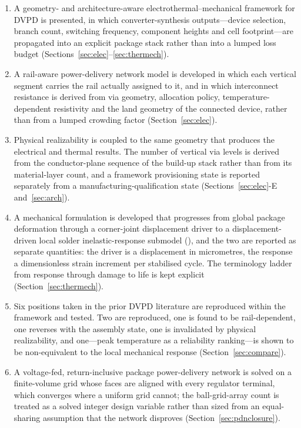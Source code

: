 \documentclass[journal]{IEEEtran}
\begin{document}
\begin{enumerate}
\item A geometry- and architecture-aware electrothermal--mechanical framework for DVPD is
presented, in which converter-synthesis outputs---device selection, branch count, switching
frequency, component heights and cell footprint---are propagated into an explicit package
stack rather than into a lumped loss budget (Sections~\ref{sec:elec}--\ref{sec:thermech}).

\item A rail-aware power-delivery network model is developed in which each vertical segment
carries the rail actually assigned to it, and in which interconnect resistance is derived
from via geometry, allocation policy, temperature-dependent resistivity and the land
geometry of the connected device, rather than from a lumped crowding factor
(Section~\ref{sec:elec}).

\item Physical realizability is coupled to the same geometry that produces the electrical
and thermal results. The number of vertical via levels is derived from the conductor-plane
sequence of the build-up stack rather than from its material-layer count, and a
framework provisioning state is reported separately from a manufacturing-qualification
state (Sections~\ref{sec:elec}-E and~\ref{sec:arch}).

\item A mechanical formulation is developed that progresses from global package deformation
through a corner-joint displacement driver to a displacement-driven local solder inelastic-response submodel (\LocalMeshPhrase), and the two are reported as
separate quantities: the driver is a displacement in micrometres, the response a
dimensionless strain increment per stabilised cycle. The terminology ladder from response
through damage to life is kept explicit (Section~\ref{sec:thermech}).

\item Six positions taken in the prior DVPD literature are reproduced within the framework
and tested. Two are reproduced, one is found to be rail-dependent, one reverses with the
assembly state, one is invalidated by physical realizability, and one---peak temperature as
a reliability ranking---is shown to be non-equivalent to the local mechanical response
(Section~\ref{sec:compare}).
\item A voltage-fed, return-inclusive package power-delivery network is solved on a
finite-volume grid whose faces are aligned with every regulator terminal, which converges
where a uniform grid cannot; the ball-grid-array count is treated as a solved integer design
variable rather than sized from an equal-sharing assumption that the network disproves
(Section~\ref{sec:pdnclosure}).


\end{enumerate}
\end{document}
